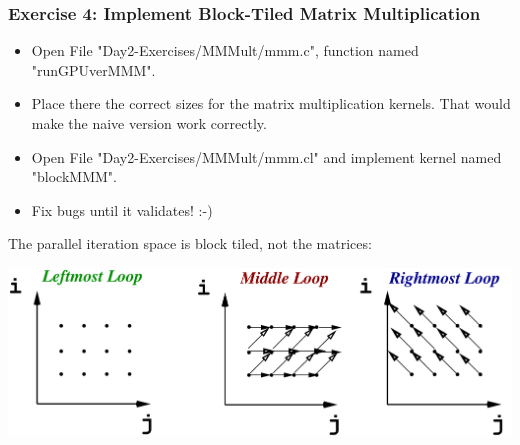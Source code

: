 \documentclass{beamer}
\begin{document}
\begin{frame}[fragile,t]
  \frametitle{Exercise 4: Implement Block-Tiled Matrix Multiplication}

\begin{itemize}
    \item Open File "Day2-Exercises/MMMult/mmm.c", function named "runGPUverMMM".
    \item Place there the correct sizes for the matrix multiplication kernels. That would make the naive version work correctly.
    \item Open File "Day2-Exercises/MMMult/mmm.cl" and implement kernel named "blockMMM".
    \item Fix bugs until it validates! :-)
\end{itemize}

\pause
The parallel iteration space is block tiled, not the matrices:

\hspace{-5ex}\includegraphics[height=20ex]{img/day2/LoopDeps} 


\end{frame}
\end{document}
